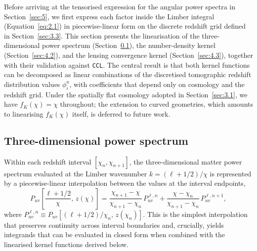 Before arriving at the tensorised expression for the angular power spectra in Section~\ref{sec:5}, we first express each factor inside the Limber integral (Equation~\ref{eq:2.1}) in piecewise-linear form on the discrete redshift grid defined in Section~\ref{sec:3.3}. This section presents the linearisation of the three-dimensional power spectrum (Section~\ref{sec:4.1}), the number-density kernel (Section~\ref{sec:4.2}), and the lensing convergence kernel (Section~\ref{sec:4.3}), together with their validation against \texttt{CCL}. The central result is that both kernel functions can be decomposed as linear combinations of the discretised tomographic redshift distribution values \(\phi^{a}_{i}\), with coefficients that depend only on cosmology and the redshift grid. Under the spatially flat cosmology adopted in Section~\ref{sec:3.1}, we have \(f_K(\chi) = \chi\) throughout; the extension to curved geometries, which amounts to linearising \(f_K(\chi)\) itself, is deferred to future work.

\subsection{Three-dimensional power spectrum} \label{sec:4.1}

Within each redshift interval \([\chi_n, \chi_{n+1}]\), the three-dimensional matter power spectrum evaluated at the Limber wavenumber \(k = (\ell + 1/2)/\chi\) is represented by a piecewise-linear interpolation between the values at the interval endpoints,
\begin{equation} \label{eq:4.1}
    P_{uv}\!\left[\frac{\ell + 1/2}{\chi},\, z(\chi)\right] = \frac{\chi_{n+1} - \chi}{\chi_{n+1} - \chi_n}\,P_{uv}^{\ell,n} + \frac{\chi - \chi_n}{\chi_{n+1} - \chi_n}\,P_{uv}^{\ell,n+1},
\end{equation}
where \(P_{uv}^{\ell,n} \equiv P_{uv}[(\ell + 1/2)/\chi_n,\, z(\chi_n)]\). This is the simplest interpolation that preserves continuity across interval boundaries and, crucially, yields integrands that can be evaluated in closed form when combined with the linearised kernel functions derived below.

